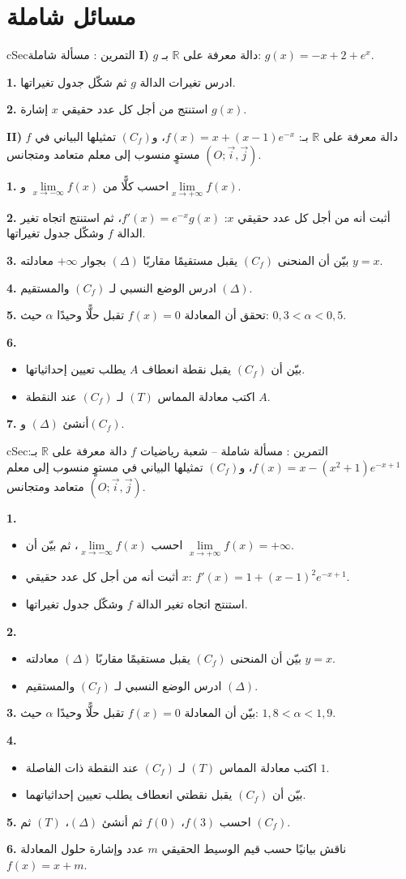 \documentclass[12pt,a4paper]{article}
\newenvironment{BOX}[2]{\begin{otherlanguage}{english}\begin{arbox}{#1}{#2}}{\end{arbox}\end{otherlanguage}}
\newcounter{exo}
\newenvironment{tamrin}[1]{\stepcounter{exo}\begin{BOX}{cSec}{التمرين \theexo: #1}}{\end{BOX}}
\newcommand{\R}{\mathbb{R}}
\newenvironment{sq}{\begin{itemize}[leftmargin=2.4em,itemsep=3pt]}{\end{itemize}}
\newcommand{\qa}{\item[(أ)]}\newcommand{\qb}{\item[(ب)]}\newcommand{\qc}{\item[(جـ)]}\newcommand{\qd}{\item[(د)]}\newcommand{\qe}{\item[(هـ)]}
\newcommand{\QQ}[1]{\par\smallskip\textbf{#1.} }
\begin{document}
\section{مسائل شاملة}
\begin{tamrin}{مسألة شاملة}
\textbf{I)} $g$ دالة معرفة على $\R$ بـ: $g(x)=-x+2+e^{x}$.
\QQ{1} ادرس تغيرات الدالة $g$ ثم شكّل جدول تغيراتها.
\QQ{2} استنتج من أجل كل عدد حقيقي $x$ إشارة $g(x)$.

\textbf{II)} $f$ دالة معرفة على $\R$ بـ: $f(x)=x+(x-1)e^{-x}$، و$(C_f)$ تمثيلها البياني في مستوٍ منسوب إلى معلم متعامد ومتجانس $(O;\vec i,\vec j)$.
\QQ{1} احسب كلًّا من $\lim\limits_{x\to-\infty}f(x)$ و$\lim\limits_{x\to+\infty}f(x)$.
\QQ{2} أثبت أنه من أجل كل عدد حقيقي $x$: $f'(x)=e^{-x}g(x)$، ثم استنتج اتجاه تغير الدالة $f$ وشكّل جدول تغيراتها.
\QQ{3} بيّن أن المنحنى $(C_f)$ يقبل مستقيمًا مقاربًا $(\Delta)$ بجوار $+\infty$ معادلته $y=x$.
\QQ{4} ادرس الوضع النسبي لـ $(C_f)$ والمستقيم $(\Delta)$.
\QQ{5} تحقق أن المعادلة $f(x)=0$ تقبل حلًّا وحيدًا $\alpha$ حيث: $0{,}3<\alpha<0{,}5$.
\QQ{6}
\begin{sq}
\qa بيّن أن $(C_f)$ يقبل نقطة انعطاف $A$ يطلب تعيين إحداثياتها.
\qb اكتب معادلة المماس $(T)$ لـ $(C_f)$ عند النقطة $A$.
\end{sq}
\QQ{7} أنشئ $(\Delta)$ و$(C_f)$.
\end{tamrin}

\begin{tamrin}{مسألة شاملة -- شعبة رياضيات}
$f$ دالة معرفة على $\R$ بـ: $f(x)=x-(x^2+1)e^{-x+1}$، و$(C_f)$ تمثيلها البياني في مستوٍ منسوب إلى معلم متعامد ومتجانس $(O;\vec i,\vec j)$.
\QQ{1}
\begin{sq}
\qa احسب $\lim\limits_{x\to-\infty}f(x)$، ثم بيّن أن $\lim\limits_{x\to+\infty}f(x)=+\infty$.
\qb أثبت أنه من أجل كل عدد حقيقي $x$: $f'(x)=1+(x-1)^2e^{-x+1}$.
\qc استنتج اتجاه تغير الدالة $f$ وشكّل جدول تغيراتها.
\end{sq}
\QQ{2}
\begin{sq}
\qa بيّن أن المنحنى $(C_f)$ يقبل مستقيمًا مقاربًا $(\Delta)$ معادلته $y=x$.
\qb ادرس الوضع النسبي لـ $(C_f)$ والمستقيم $(\Delta)$.
\end{sq}
\QQ{3} بيّن أن المعادلة $f(x)=0$ تقبل حلًّا وحيدًا $\alpha$ حيث: $1{,}8<\alpha<1{,}9$.
\QQ{4}
\begin{sq}
\qa اكتب معادلة المماس $(T)$ لـ $(C_f)$ عند النقطة ذات الفاصلة $1$.
\qb بيّن أن $(C_f)$ يقبل نقطتي انعطاف يطلب تعيين إحداثياتهما.
\end{sq}
\QQ{5} احسب $f(3)$، $f(0)$ ثم أنشئ $(\Delta)$، $(T)$ ثم $(C_f)$.
\QQ{6} ناقش بيانيًا حسب قيم الوسيط الحقيقي $m$ عدد وإشارة حلول المعادلة $f(x)=x+m$.
\end{tamrin}
\end{document}
